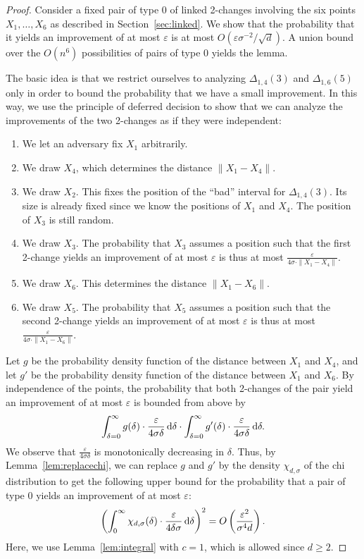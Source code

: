 \documentclass[11pt,DIV=12,a4paper]{scrartcl}
\newcommand{\eps}{\varepsilon}
\begin{document}
\begin{proof}
Consider a fixed pair of type 0 of linked 2-changes involving the six points $X_1, \ldots, X_6$ as described in Section~\ref{sec:linked}.
We show that the probability that it yields an improvement of at most $\eps$ is at most $O(\eps \sigma^{-2} / \sqrt d)$.
A union bound over the $O(n^6)$ possibilities of pairs of type 0 yields the lemma.

The basic idea is that we restrict ourselves to analyzing $\Delta_{1,4}(3)$ and $\Delta_{1,6}(5)$ only in order to
bound the probability that we have a small improvement.
In this way, we use the principle of deferred decision to show that we can analyze the improvements of the two 2-changes as if they were independent:
\begin{enumerate}[label=\arabic{*}.]
\item We let an adversary fix $X_1$ arbitrarily.
\item We draw $X_4$, which determines the distance $\|X_1 - X_4\|$.
\item We draw $X_2$. This fixes the position of the ``bad'' interval for $\Delta_{1,4}(3)$. Its size is already fixed since
we know the positions of $X_1$ and $X_4$. The position of $X_3$ is still random.
\item We draw $X_3$. The probability that
$X_3$ assumes a position such that the first 2-change yields an improvement of at most $\eps$ is thus at most $\frac{\eps}{4 \sigma \cdot \|X_1 - X_4\|}$.
\item We draw $X_6$. This determines the distance $\|X_1 - X_6\|$.
\item We draw $X_5$. The probability that $X_5$ assumes a position
such that the second 2-change yields an improvement of at most $\eps$ is thus at most $\frac{\eps}{4 \sigma \cdot \|X_1 - X_6\|}$.
\end{enumerate}

Let $g$ be the probability density function of the distance between $X_1$ and $X_4$, and let
$g'$ be the probability density function of the distance between $X_1$ and $X_6$.
By independence of the points, the probability that both 2-changes of the pair yield an improvement of at most $\eps$
is bounded from above by
\[
\int_{\delta=0}^\infty g(\delta) \cdot \frac{\eps}{4 \sigma \delta} \, \textup d \delta
\cdot 
\int_{\delta=0}^\infty g'(\delta) \cdot \frac{\eps}{4 \sigma \delta} \, \textup d \delta.
\]
We observe that $\frac{\eps}{4 \sigma \delta}$ is monotonically decreasing in $\delta$.
Thus, by Lemma~\ref{lem:replacechi}, we can replace $g$ and $g'$ by the density $\chi_{d,\sigma}$ of the chi distribution
to get the following upper bound for the probability that a pair of type 0 yields an improvement of at most $\eps$:
\[
\left(\int_{0}^{\infty} \chi_{d,\sigma}(\delta) \cdot \frac{\eps}{4 \delta \sigma} \, \textup d \delta \right)^2=
O\left(\frac{\eps^2}{\sigma^4 d}\right).
\]
Here, we use Lemma~\ref{lem:integral} with $c=1$, which is allowed since $d \geq 2$.
\end{proof}
\end{document}
